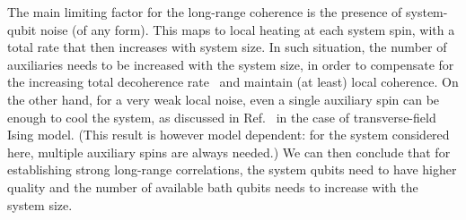 \documentclass[twocolumn,amsmath,amssymb,pra]{revtex4-2}
\begin{document}
The main limiting factor for the long-range coherence is the presence of system-qubit noise (of any form).
This maps to local heating at each system spin, with a total rate that then increases with system size.
In such situation,
the number of auxiliaries needs to be increased with the system size,
in order to compensate for the increasing total decoherence rate~\cite{Mi2023} and maintain (at least) local coherence.
On the other hand, for a very weak local noise, even a single auxiliary spin can be enough to cool the system,
as discussed in Ref.~\cite{Raghunandan_2020} in the case of transverse-field Ising model.
(This result is however model dependent: for the system considered here, multiple auxiliary spins are always needed.)
We can then conclude that for establishing strong long-range correlations, the system qubits need to have higher quality
and the number of available bath qubits needs to increase with the system size.











\end{document}
